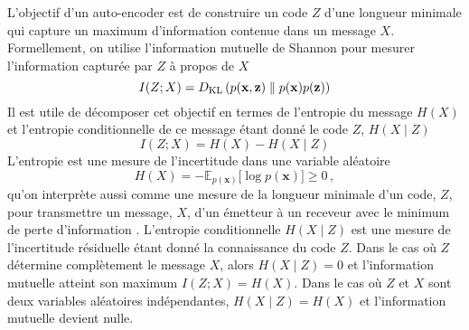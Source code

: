 L'objectif d'un auto-encoder est de construire un code $Z$ d'une longueur minimale qui capture un maximum d'information contenue dans un message $X$. 
Formellement, on utilise l'information mutuelle de Shannon pour mesurer l'information capturée par $Z$ à propos de $X$
\begin{equation}\label{eq:ShannonInfo}
        I(Z ; X) = D_{\mathrm{KL}}\left(p(\mathbf{x}, \mathbf{z}) \KL p(\mathbf{x}) p(\mathbf{z})\right) %
\end{equation} 
Il est utile de décomposer cet objectif en termes de l'entropie du message $H(X)$ et l'entropie 
conditionnelle de ce message étant donné le code $Z$, $H(X \mid Z)$
\begin{equation}\label{eq:info entropy}
       I(Z; X) = H(X) - H(X \mid Z) 
\end{equation} 
L'entropie est une mesure de l'incertitude dans une variable aléatoire
\begin{equation}\label{eq:entropy}
        H(X) = -\mathbb{E}_{p(\mathbf{x})}\big[\log p(\mathbf{x}) \big] \geq 0\, ,
\end{equation} 
qu'on interprète aussi comme une mesure de la longueur minimale d'un code, $Z$, pour 
transmettre un message, $X$, d'un émetteur à un receveur avec le minimum de perte d'information \citep{Shannon1948,Kolmogorov1965}.
L'entropie conditionnelle $H(X \mid Z)$ est une  mesure de l'incertitude résiduelle étant donné la connaissance du code $Z$. Dans le cas où $Z$ 
détermine complètement le message $X$, alors $H(X \mid Z) = 0$ et l'information mutuelle atteint son maximum $I(Z; X) = H(X)$.
Dans le cas où $Z$ et $X$ sont deux variables aléatoires indépendantes, $H(X \mid Z) = H(X)$ et l'information mutuelle devient nulle.

